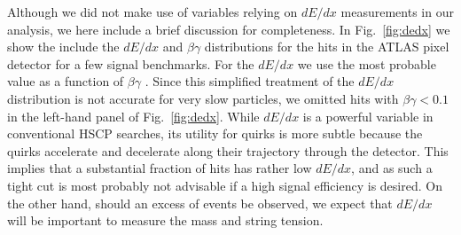 \documentclass[10pt,aps,prd,nofootinbib,superscriptaddress,twocolumn,preprintnumbers,balancelastpage]{revtex4}
\begin{document}
Although we did not make use of variables relying on $dE/dx$ measurements in our analysis, we here include a brief discussion for completeness. In Fig.~\ref{fig:dedx} we show the include the $dE/dx$ and $\beta\gamma$ distributions for the hits in the ATLAS pixel detector for a few signal benchmarks. For the $dE/dx$ we use the most probable value as a function of $\beta\gamma$ \cite{Olive:2016xmw}. Since this simplified treatment of the $dE/dx$ distribution is not accurate for very slow particles, we omitted hits with $\beta\gamma<0.1$ in the left-hand panel of Fig.~\ref{fig:dedx}. While $dE/dx$ is a powerful variable in conventional HSCP searches, its utility for quirks is more subtle because the quirks accelerate and decelerate along their trajectory through the detector. This implies that a substantial fraction of hits has rather low $dE/dx$, and as such a tight cut is most probably not advisable if a high signal efficiency is desired. On the other hand, should an excess of events be observed, we expect that $dE/dx$ will be important to measure the mass and string tension.





\FloatBarrier




  
  
\end{document}
